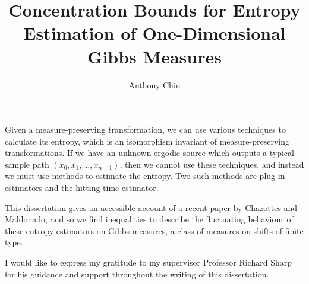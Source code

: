 \documentclass[12pt,MSc]{muthesis}
\theoremstyle{plain}
\theoremstyle{nonumberplain}
\begin{document}
\title{Concentration Bounds for Entropy Estimation of One-Dimensional Gibbs Measures}
\author{Anthony Chiu}
\immediate{}
\def\wordcount{}

\tablespagefalse

\figurespagefalse

\beforeabstract

Given a measure-preserving transformation, we can use various techniques to calculate its entropy, which is an isomorphism invariant of measure-preserving transformations. If we have an unknown ergodic source which outputs a typical sample path $(x_0, x_1, \dots, x_{n - 1})$, then we cannot use these techniques, and instead we must use methods to estimate the entropy. Two such methods are plug-in estimators and the hitting time estimator.

This dissertation gives an accessible account of a recent paper by Chazottes and Maldonado, and so we find inequalities to describe the fluctuating behaviour of these entropy estimators on Gibbs measures, a class of measures on shifts of finite type.

\afterabstract

I would like to express my gratitude to my supervisor Professor Richard Sharp for his guidance and support throughout the writing of this dissertation.

\afterpreface









\appendix





\end{document}
